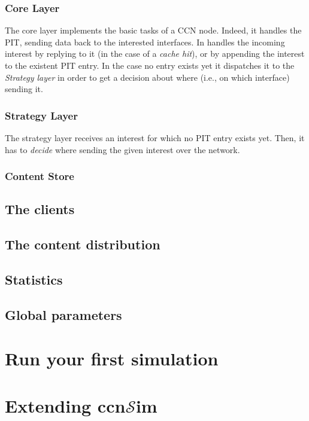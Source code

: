 \documentclass{article}
\newcommand{\ccnsim}{ccn$\mathcal{S}$im}
\begin{document}
\subsubsection{Core Layer} 
The core layer implements the basic tasks of a CCN node. Indeed, it handles the PIT, sending data back to the interested interfaces. In handles the incoming interest by replying to it (in the case of a \emph{cache hit}), or by  appending the interest to the existent PIT entry. In the case no entry exists yet it dispatches it to the \emph{Strategy layer} in order to get a decision about where (i.e., on which interface) sending it. 
\subsubsection{Strategy Layer}
The strategy layer receives an interest for which no PIT entry exists yet. Then, it has to \emph{decide} where sending the given interest over the network. 
\subsubsection{Content Store}

\subsection{The clients}
\subsection{The content distribution}
\subsection{Statistics}
\subsection{Global parameters}

\section{Run your first simulation}
\section{Extending \ccnsim}


\end{document}
